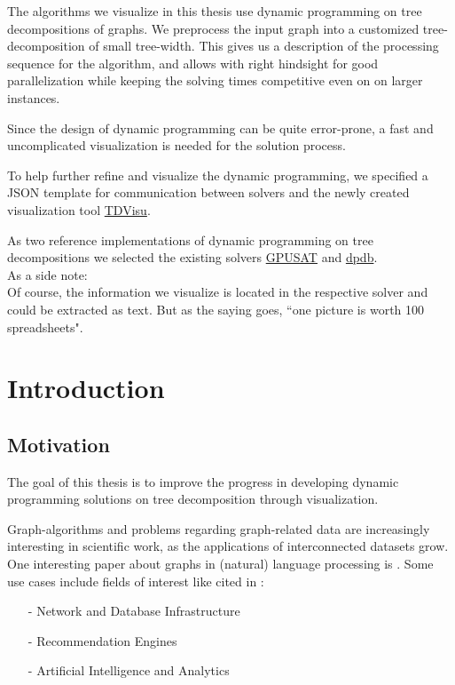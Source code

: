 \documentclass[a4paper, 12pt, bibliography=totoc]{scrartcl}
\begin{document}
The algorithms we visualize in this thesis use dynamic programming on tree decompositions of graphs.
We preprocess the input graph into a customized tree-decomposition of small tree-width.
This gives us a description of the processing sequence for the algorithm, and allows 
with right hindsight for good parallelization while keeping the solving times competitive even on on larger instances.

Since the design of dynamic programming can be quite error-prone, a fast and uncomplicated visualization is needed for the solution process.

To help further refine and visualize the dynamic programming,
we specified a JSON template for communication between solvers and the newly created visualization tool \href{github.com/VaeterchenFrost/tdvisu}{TDVisu}.

As two reference implementations of dynamic programming on tree decompositions we selected the existing solvers \href{github.com/daajoe/GPUSAT}{GPUSAT} and \href{github.com/hmarkus/dp_on_dbs}{dpdb}.\\


As a side note: \\
Of course, the information we visualize is located in the respective solver and could be extracted as text. But as the saying goes, ``one picture is worth 100 spreadsheets".


{%
	\newpage
	
\tableofcontents
}

\newpage


\section{Introduction}
\subsection{Motivation}

The goal of this thesis is to improve the progress in developing dynamic programming solutions on tree decomposition through visualization.

Graph-algorithms and problems regarding graph-related data are increasingly interesting in scientific work, as the applications of interconnected datasets grow. One interesting paper about graphs in (natural) language processing is \cite{jones-etal-2013-modeling}.
Some use cases include fields of interest like cited in \cite{graphUseCases}: %
\begin{itemize}
	\item[-] Network and Database Infrastructure
	\item[-] Recommendation Engines
	\item[-] Artificial Intelligence and Analytics
\end{itemize}
\end{document}

